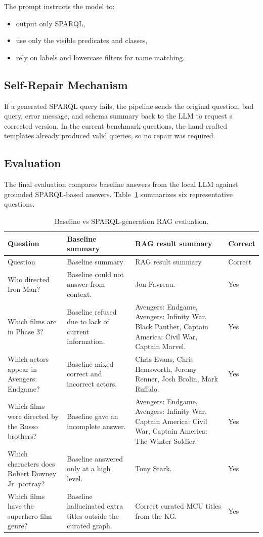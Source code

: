 \documentclass[11pt,a4paper]{article}
\begin{document}
The prompt instructs the model to:
\begin{itemize}
  \item output only SPARQL,
  \item use only the visible predicates and classes,
  \item rely on labels and lowercase filters for name matching.
\end{itemize}

\subsection{Self-Repair Mechanism}
If a generated SPARQL query fails, the pipeline sends the original question, bad query, error message, and schema summary back to the LLM to request a corrected version. In the current benchmark questions, the hand-crafted templates already produced valid queries, so no repair was required.

\subsection{Evaluation}
The final evaluation compares baseline answers from the local LLM against grounded SPARQL-based answers. Table~\ref{tab:rag} summarizes six representative questions.

\begin{longtable}{p{}p{}p{}p{}}
\caption{Baseline vs SPARQL-generation RAG evaluation.}\label{tab:rag}\\
\toprule
Question & Baseline summary & RAG result summary & Correct \\
\midrule
\endfirsthead
\toprule
Question & Baseline summary & RAG result summary & Correct \\
\midrule
\endhead
Who directed Iron Man? & Baseline could not answer from context. & Jon Favreau. & Yes \\
Which films are in Phase 3? & Baseline refused due to lack of current information. & Avengers: Endgame, Avengers: Infinity War, Black Panther, Captain America: Civil War, Captain Marvel. & Yes \\
Which actors appear in Avengers: Endgame? & Baseline mixed correct and incorrect actors. & Chris Evans, Chris Hemsworth, Jeremy Renner, Josh Brolin, Mark Ruffalo. & Yes \\
Which films were directed by the Russo brothers? & Baseline gave an incomplete answer. & Avengers: Endgame, Avengers: Infinity War, Captain America: Civil War, Captain America: The Winter Soldier. & Yes \\
Which characters does Robert Downey Jr. portray? & Baseline answered only at a high level. & Tony Stark. & Yes \\
Which films have the superhero film genre? & Baseline hallucinated extra titles outside the curated graph. & Correct curated MCU titles from the KG. & Yes \\
\bottomrule
\end{longtable}
\end{document}
